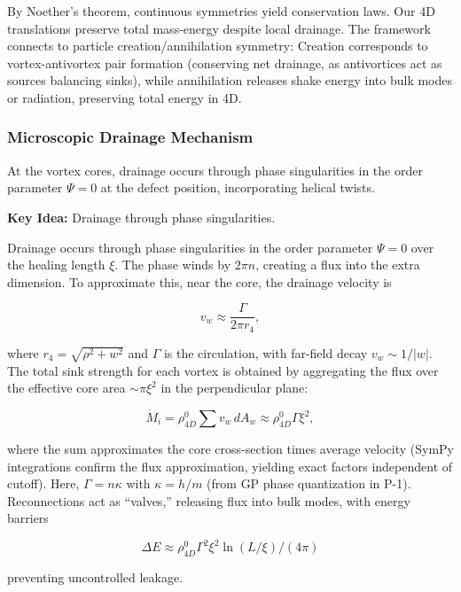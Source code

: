 By Noether's theorem, continuous symmetries yield conservation laws. Our 4D translations preserve total mass-energy despite local drainage. The framework connects to particle creation/annihilation symmetry: Creation corresponds to vortex-antivortex pair formation (conserving net drainage, as antivortices act as sources balancing sinks), while annihilation releases shake energy into bulk modes or radiation, preserving total energy in 4D.

\subsubsection{Microscopic Drainage Mechanism}
At the vortex cores, drainage occurs through phase singularities in the order parameter $\Psi=0$ at the defect position, incorporating helical twists.

\textbf{Key Idea:} Drainage through phase singularities.

Drainage occurs through phase singularities in the order parameter $\Psi=0$ over the healing length $\xi$. The phase winds by $2\pi n$, creating a flux into the extra dimension. To approximate this, near the core, the drainage velocity is

\begin{equation}
v_w \approx \frac{\Gamma}{2\pi r_4},
\end{equation}

where $r_4 = \sqrt{\rho^2 + w^2}$ and $\Gamma$ is the circulation, with far-field decay $v_w \sim 1/|w|$. The total sink strength for each vortex is obtained by aggregating the flux over the effective core area $\sim \pi \xi^2$ in the perpendicular plane:

\begin{equation}
\dot{M}_i = \rho_{4D}^0 \sum v_w \, dA_w \approx \rho_{4D}^0 \Gamma \xi^2,
\end{equation}

where the sum approximates the core cross-section times average velocity (SymPy integrations confirm the flux approximation, yielding exact factors independent of cutoff). Here, $\Gamma = n \kappa$ with $\kappa = h / m$ (from GP phase quantization in P-1). Reconnections act as ``valves,'' releasing flux into bulk modes, with energy barriers

\begin{equation}
\Delta E \approx \rho_{4D}^0 \Gamma^2 \xi^2 \ln(L / \xi) / (4\pi)
\end{equation}

preventing uncontrolled leakage.

